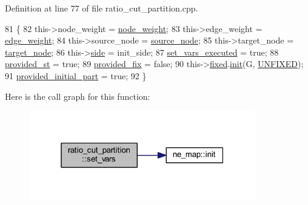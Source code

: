 Definition at line 77 of file ratio\+\_\+cut\+\_\+partition.\+cpp.


\begin{DoxyCode}
81 \{
82     this->node\_weight = \mbox{\hyperlink{classratio__cut__partition_a4d9d2a9317a062f839ea7155c37b173f}{node\_weight}};
83     this->edge\_weight = \mbox{\hyperlink{classratio__cut__partition_a48a85c82fb09b83c9d494d6d1232fab2}{edge\_weight}};
84     this->source\_node = \mbox{\hyperlink{classratio__cut__partition_abb18c3acafc590e258453d7a8d86bb49}{source\_node}};
85     this->target\_node = \mbox{\hyperlink{classratio__cut__partition_a343ba76869e64141fb795010e388744b}{target\_node}};
86     this->\mbox{\hyperlink{classratio__cut__partition_a2bf913d1d8607747885177a3b585e611}{side}} = init\_side;
87     \mbox{\hyperlink{classratio__cut__partition_aa722d032cb59664894c6301ceee86729}{set\_vars\_executed}} = \textcolor{keyword}{true};
88     \mbox{\hyperlink{classratio__cut__partition_a248512624766f0b21d154b4841c95a1d}{provided\_st}} = \textcolor{keyword}{true};
89     \mbox{\hyperlink{classratio__cut__partition_a5f1f85feae589f7d39da48a412c90376}{provided\_fix}} = \textcolor{keyword}{false};
90     this->\mbox{\hyperlink{classratio__cut__partition_ad77023b9f60e88274bf54f2019404768}{fixed}}.\mbox{\hyperlink{classne__map_a4ef2ab4aebcb57a7a101975bf6a88e24}{init}}(G, \mbox{\hyperlink{classratio__cut__partition_a153cc7e51ac5d72a00671b6bdbcc6fa5}{UNFIXED}});
91     \mbox{\hyperlink{classratio__cut__partition_a963258b950f7142e3cac714353b1b21e}{provided\_initial\_part}} = \textcolor{keyword}{true};
92 \}
\end{DoxyCode}
Here is the call graph for this function\+:\nopagebreak
\begin{figure}[H]
\begin{center}
\leavevmode
\includegraphics[width=280pt]{classratio__cut__partition_a67ea2ccb8b5cce2e4acd8e10e112a962_cgraph}
\end{center}
\end{figure}
\mbox{\label{classratio__cut__partition_a2c09504b727a1b1d1e2f99a3a42de05b}} 
